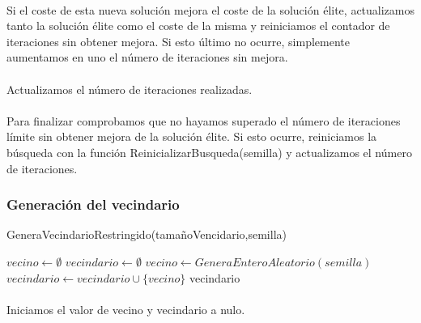 \documentclass{article}
\begin{document}
		\paragraph{}Si el coste de esta nueva solución mejora el coste de la solución élite, actualizamos tanto la solución élite como el coste de la misma y reiniciamos el contador de iteraciones sin obtener mejora. Si esto último no ocurre, simplemente aumentamos en uno el número de iteraciones sin mejora.
		
		\paragraph{}Actualizamos el número de iteraciones realizadas.
		
		\paragraph{}Para finalizar comprobamos que no hayamos superado el número de iteraciones límite sin obtener mejora de la solución élite. Si esto ocurre, reiniciamos la búsqueda con la función ReinicializarBusqueda(semilla) y actualizamos el número de iteraciones.
		
		\paragraph{}
		
		
		\subsubsection{Generación del vecindario}
		
		\begin{algorithm}[H]
			\caption{GeneraVecindarioRestringido(tamañoVencidario,semilla)}
			\begin{algorithmic}
				\STATE $vecino \leftarrow \emptyset$
				\STATE $vecindario \leftarrow \emptyset$	
				\STATE $vecino \leftarrow GeneraEnteroAleatorio(semilla)$
				\STATE $vecindario \leftarrow vecindario \cup \{vecino\}$
				\ENDIF
				\ENDWHILE
				\RETURN vecindario
			\end{algorithmic}
		\end{algorithm}
	
		\paragraph{}Iniciamos el valor de vecino y vecindario a nulo.
		
\end{document}
